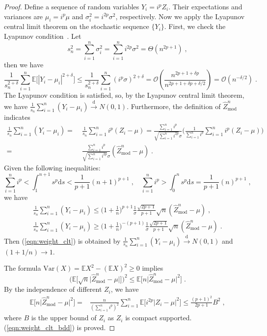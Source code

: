 \documentclass[final]{siamart1116}
\def \co {\mathcal{O}}
\def \E  {\mathbb{E}}
\begin{document}
\begin{proof}
Define a sequence of random variables $Y_{i} = i^p Z_i$. Their expectations and variances are $\mu_i = i^p \mu$ and  $\sigma^2_i = i^{2p} \sigma^2$, respectively. Now we apply the Lyapunov central limit theorem on the stochastic sequence $\{Y_i\}$. First, we check the Lyapunov condition~\cite{billingsley2008probability}.
Let
\[
s_n^2 = \sum_{i=1}^n \sigma^2_i = \sum_{i=1}^n i^{2p}\sigma^2 = \Theta (n^{2p+1}) \;,
\]
then we have
\begin{equation}
\label{eqn:lyapunov} \frac{1}{s_n^{2+\delta}}\sum_{i=1}^n \E\Big[|Y_i - \mu_i|^{2+\delta}\Big]\leq \frac{1}{s_n^{2+\delta}}\sum_{i=1}^n (i^p\sigma)^{2+\delta} = \co\left( \frac{n^{2p + 1 + \delta p}}{n^{2p+1+\delta p + \delta/2}} \right) = \co (n^{-\delta/2}) \;.
\end{equation}
The Lyapunov condition is satisfied, so, by the Lyapunov central limit theorem, we have $\frac{1}{s_n}\sum_{i=1}^n (Y_i - \mu_i ) \overset{\text{d}}{\to} N(0,1)$. Furthermore, the definition of $\hat{Z}^n_{\mathrm{mod}}$ indicates
\[
\begin{aligned}
\frac{1}{s_n}\sum_{i=1}^n (Y_i - \mu_i ) =& \; \frac{1}{s_n}\sum_{i=1}^n i^p(Z_i - \mu ) = \frac{\sum_{i=1}^ni^p}{\sqrt{\sum_{i=1}^ni^{2p}}\sigma}\bigg(\frac{1}{\sum_{i=1}^ni^p}\sum_{i=1}^n i^p(Z_i - \mu ) \bigg)\\ =& \;\frac{\sum_{i=1}^ni^p}{\sqrt{\sum_{i=1}^ni^{2p}}\sigma} (\hat{Z}^n_{\mathrm{mod}} - \mu) \;.
\end{aligned}
\]
Given the following inequalities:
\[
\sum_{i=1}^ni^p < \int^{n+1}_1 s^p \text{d}s < \frac{1}{p+1}(n+1)^{p+1} \;, \quad
\sum_{i=1}^ni^p > \int^{n}_0 s^p \text{d}s = \frac{1}{p+1}(n)^{p+1} \;,
\]
we have
\[
\begin{aligned}\frac{1}{s_n}\sum_{i=1}^n (Y_i - \mu_i ) \leq \Big(1+\frac{1}{n}\Big)^{p+1} \frac{1}{\sigma}\frac{\sqrt{2p+1}}{p+1}\sqrt{n} (\hat{Z}^n_{\mathrm{mod}} - \mu) \;,\\\frac{1}{s_n}\sum_{i=1}^n (Y_i - \mu_i ) \geq \Big(1+\frac{1}{n}\Big)^{-(p+1)} \frac{1}{\sigma}\frac{\sqrt{2p+1}}{p+1}\sqrt{n} (\hat{Z}^n_{\mathrm{mod}} - \mu) \;.
\end{aligned}
\]
Then (\ref{eqn:weight_clt}) is obtained by $\frac{1}{s_n}\sum_{i=1}^n (Y_i - \mu_i ) \overset{\text{d}}{\to} N(0,1)$ and $(1+1/n)\to 1$.

The formula $\text{Var}(X) = \E X^2 - (\E X)^2 \geq0$ implies
\[
\bigg(\E\Big[\sqrt{n}\big|\hat{Z}^n_{\mathrm{mod}} - \mu\big|\Big]\bigg)^2 \leq \E\Big[n\big|\hat{Z}^n_{\mathrm{mod}} - \mu\big|^2\Big] \;.
\]
By the independence of different $Z_i$, we have
\[
\begin{aligned}
\E\Big[n\big|\hat{Z}^n_{\mathrm{mod}} - \mu\big|^2\Big] =& \frac{n}{(\sum_{i=1}^ni^p)^2} \sum_{i=1}^n \E\Big[ i^{2p}\big|Z_i - \mu\big|^2 \Big] \leq\frac{(p+1)^2}{2p+1} B^2 \;,
\end{aligned}
\]
where $B$ is the upper bound of $Z_i$ as $Z_i$ is compact supported. (\ref{eqn:weight_clt_bdd}) is proved.
\end{proof}
\end{document}
